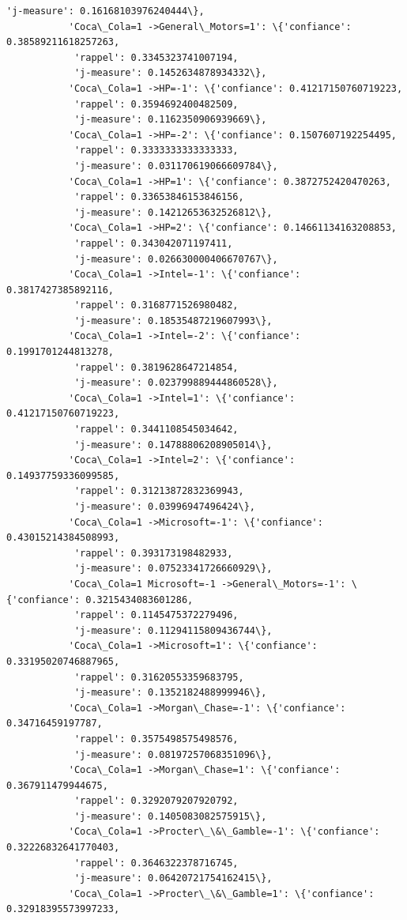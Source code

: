 \documentclass[11pt]{article}
\begin{document}
\begin{Verbatim}[commandchars=\\\{\}]
            'j-measure': 0.16168103976240444\},
           'Coca\_Cola=1 ->General\_Motors=1': \{'confiance': 0.38589211618257263,
            'rappel': 0.3345323741007194,
            'j-measure': 0.1452634878934332\},
           'Coca\_Cola=1 ->HP=-1': \{'confiance': 0.41217150760719223,
            'rappel': 0.3594692400482509,
            'j-measure': 0.1162350906939669\},
           'Coca\_Cola=1 ->HP=-2': \{'confiance': 0.1507607192254495,
            'rappel': 0.3333333333333333,
            'j-measure': 0.031170619066609784\},
           'Coca\_Cola=1 ->HP=1': \{'confiance': 0.3872752420470263,
            'rappel': 0.33653846153846156,
            'j-measure': 0.14212653632526812\},
           'Coca\_Cola=1 ->HP=2': \{'confiance': 0.14661134163208853,
            'rappel': 0.343042071197411,
            'j-measure': 0.026630000406670767\},
           'Coca\_Cola=1 ->Intel=-1': \{'confiance': 0.3817427385892116,
            'rappel': 0.3168771526980482,
            'j-measure': 0.18535487219607993\},
           'Coca\_Cola=1 ->Intel=-2': \{'confiance': 0.1991701244813278,
            'rappel': 0.3819628647214854,
            'j-measure': 0.023799889444860528\},
           'Coca\_Cola=1 ->Intel=1': \{'confiance': 0.41217150760719223,
            'rappel': 0.3441108545034642,
            'j-measure': 0.14788806208905014\},
           'Coca\_Cola=1 ->Intel=2': \{'confiance': 0.14937759336099585,
            'rappel': 0.31213872832369943,
            'j-measure': 0.03996947496424\},
           'Coca\_Cola=1 ->Microsoft=-1': \{'confiance': 0.43015214384508993,
            'rappel': 0.393173198482933,
            'j-measure': 0.07523341726660929\},
           'Coca\_Cola=1 Microsoft=-1 ->General\_Motors=-1': \{'confiance': 0.3215434083601286,
            'rappel': 0.1145475372279496,
            'j-measure': 0.11294115809436744\},
           'Coca\_Cola=1 ->Microsoft=1': \{'confiance': 0.33195020746887965,
            'rappel': 0.31620553359683795,
            'j-measure': 0.1352182488999946\},
           'Coca\_Cola=1 ->Morgan\_Chase=-1': \{'confiance': 0.34716459197787,
            'rappel': 0.3575498575498576,
            'j-measure': 0.08197257068351096\},
           'Coca\_Cola=1 ->Morgan\_Chase=1': \{'confiance': 0.367911479944675,
            'rappel': 0.3292079207920792,
            'j-measure': 0.1405083082575915\},
           'Coca\_Cola=1 ->Procter\_\&\_Gamble=-1': \{'confiance': 0.32226832641770403,
            'rappel': 0.3646322378716745,
            'j-measure': 0.06420721754162415\},
           'Coca\_Cola=1 ->Procter\_\&\_Gamble=1': \{'confiance': 0.32918395573997233,

\end{Verbatim}
\end{document}
